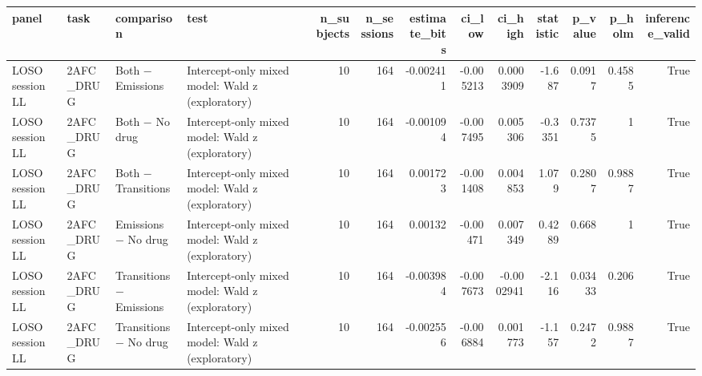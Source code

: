 \begin{tabular}{llllrrrrrrrrr}
\toprule
panel & task & comparison & test & n\_subjects & n\_sessions & estimate\_bits & ci\_low & ci\_high & statistic & p\_value & p\_holm & inference\_valid \\
\midrule
LOSO session LL & 2AFC\_DRUG & Both − Emissions & Intercept-only mixed model: Wald z (exploratory) & 10 & 164 & -0.002411 & -0.005213 & 0.0003909 & -1.687 & 0.0917 & 0.4585 & True \\
LOSO session LL & 2AFC\_DRUG & Both − No drug & Intercept-only mixed model: Wald z (exploratory) & 10 & 164 & -0.001094 & -0.007495 & 0.005306 & -0.3351 & 0.7375 & 1 & True \\
LOSO session LL & 2AFC\_DRUG & Both − Transitions & Intercept-only mixed model: Wald z (exploratory) & 10 & 164 & 0.001723 & -0.001408 & 0.004853 & 1.079 & 0.2807 & 0.9887 & True \\
LOSO session LL & 2AFC\_DRUG & Emissions − No drug & Intercept-only mixed model: Wald z (exploratory) & 10 & 164 & 0.00132 & -0.00471 & 0.007349 & 0.4289 & 0.668 & 1 & True \\
LOSO session LL & 2AFC\_DRUG & Transitions − Emissions & Intercept-only mixed model: Wald z (exploratory) & 10 & 164 & -0.003984 & -0.007673 & -0.0002941 & -2.116 & 0.03433 & 0.206 & True \\
LOSO session LL & 2AFC\_DRUG & Transitions − No drug & Intercept-only mixed model: Wald z (exploratory) & 10 & 164 & -0.002556 & -0.006884 & 0.001773 & -1.157 & 0.2472 & 0.9887 & True \\
\bottomrule
\end{tabular}
